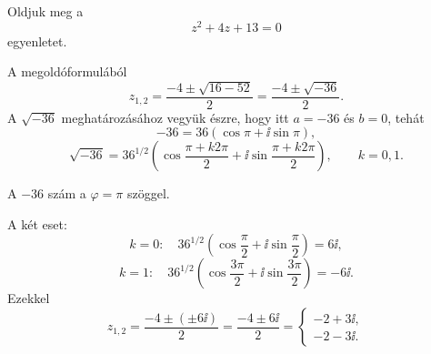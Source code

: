 \documentclass[11pt]{article}
\begin{document}
\begin{exbox}
\begin{example}
Oldjuk meg a
\[
z^{2}+4z+13=0
\]
egyenletet.
\end{example}
\end{exbox}
\begin{solution}
A megoldóformulából
\[
z_{1,2}=\frac{-4\pm\sqrt{16-52}}{2}=\frac{-4\pm\sqrt{-36}}{2}.
\]
A $\sqrt{-36}$ meghatározásához vegyük észre, hogy itt $a=-36$ és $b=0$, tehát
\[
-36=36(\cos\pi+\ii\sin\pi),
\]
\[
\sqrt{-36}=36^{1/2}\left(\cos\frac{\pi+k2\pi}{2}+\ii\sin\frac{\pi+k2\pi}{2}\right),\qquad k=0, 1 .
\]

\begin{notefig}{A $-36$ szám a $\varphi=\pi$ szöggel.}
\end{notefig}

\noindent A két eset:
\[
k=0:\quad 36^{1/2}\left(\cos\frac{\pi}{2}+\ii\sin\frac{\pi}{2}\right)=6\ii,
\]
\[
k=1:\quad 36^{1/2}\left(\cos\frac{3\pi}{2}+\ii\sin\frac{3\pi}{2}\right)=-6\ii .
\]
Ezekkel
\[
z_{1,2}=\frac{-4\pm(\pm 6\ii)}{2}=\frac{-4\pm 6\ii}{2}=
\begin{cases}
-2+3\ii,\\
-2-3\ii .
\end{cases}
\]
\end{solution}
\end{document}
